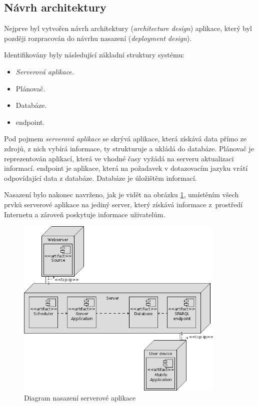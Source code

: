 \subsection{Návrh architektury}
Nejprve byl vytvořen návrh architektury (\textit{architecture design}) aplikace, který byl později rozpracován do návrhu nasazení (\textit{deployment design}).

Identifikovány byly následující základní struktury systému:
\begin{itemize}
 \item \textit{Serverová aplikace.}
 \item Plánovač.
 \item Databáze.
 \item {} endpoint.
\end{itemize}
Pod pojmem \textit{serverová aplikace} se skrývá aplikace, která získává data přímo ze zdrojů, z nich vybírá informace, ty strukturuje a ukládá do databáze. Plánovač je reprezentován aplikací, která ve vhodné časy vyžádá na serveru aktualizaci informací.  endpoint je aplikace, která na požadavek v dotazovacím jazyku vrátí odpovídající data z databáze. Databáze je úložištěm informací.

Nasazení bylo nakonec navrženo, jak je vidět na obrázku \ref{fig:server:deployment}, umístěním všech prvků serverové aplikace na jediný server, který získává informace z~prostředí Internetu a zároveň poskytuje informace uživatelům.
\begin{figure}[h]
 \centering
 \includegraphics[width=10cm]{./figures/deployment-s.png}
 \caption{Diagram nasazení serverové aplikace}
 \label{fig:server:deployment}
\end{figure}


